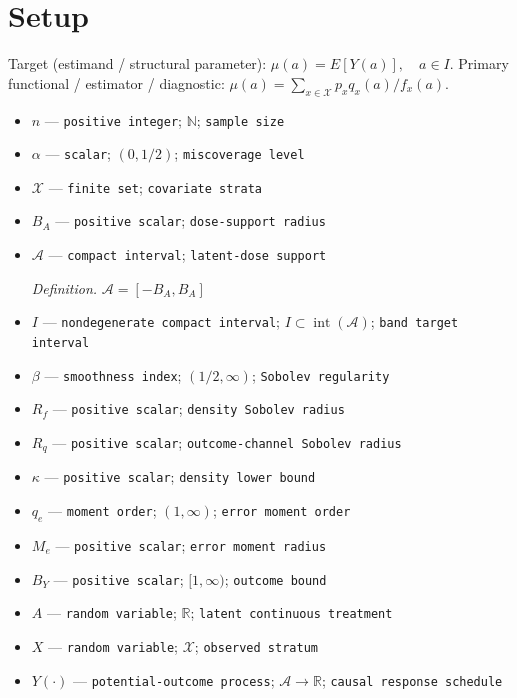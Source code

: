 \documentclass{article}
\begin{document}
\section{Setup}

Target (estimand / structural parameter): \(\mu(a)=E[Y(a)],\quad a\in I\).
Primary functional / estimator / diagnostic: \(\mu(a)=\sum_{x\in\mathcal X}p_xq_x(a)/f_x(a)\).
\begin{itemize}
  \item \(n\) --- \texttt{positive integer}; \(\mathbb N\); \texttt{sample size}
  \item \(\alpha\) --- \texttt{scalar}; \((0,1/2)\); \texttt{miscoverage level}
  \item \(\mathcal X\) --- \texttt{finite set}; \texttt{covariate strata}
  \item \(B_A\) --- \texttt{positive scalar}; \texttt{dose-\allowbreak{}support radius}
  \item \(\mathcal A\) --- \texttt{compact interval}; \texttt{latent-\allowbreak{}dose support}
  \par\smallskip\noindent\emph{Definition.} \(\mathcal A=[-B_A,B_A]\)
  \item \(I\) --- \texttt{nondegenerate compact interval}; \(I\subset\operatorname{int}(\mathcal A)\); \texttt{band target interval}
  \item \(\beta\) --- \texttt{smoothness index}; \((1/2,\infty)\); \texttt{Sobolev regularity}
  \item \(R_f\) --- \texttt{positive scalar}; \texttt{density Sobolev radius}
  \item \(R_q\) --- \texttt{positive scalar}; \texttt{outcome-\allowbreak{}channel Sobolev radius}
  \item \(\kappa\) --- \texttt{positive scalar}; \texttt{density lower bound}
  \item \(q_e\) --- \texttt{moment order}; \((1,\infty)\); \texttt{error moment order}
  \item \(M_e\) --- \texttt{positive scalar}; \texttt{error moment radius}
  \item \(B_Y\) --- \texttt{positive scalar}; \([1,\infty)\); \texttt{outcome bound}
  \item \(A\) --- \texttt{random variable}; \(\mathbb R\); \texttt{latent continuous treatment}
  \item \(X\) --- \texttt{random variable}; \(\mathcal X\); \texttt{observed stratum}
  \item \(Y(\cdot)\) --- \texttt{potential-\allowbreak{}outcome process}; \(\mathcal A\to\mathbb R\); \texttt{causal response schedule}

\end{itemize}
\end{document}
